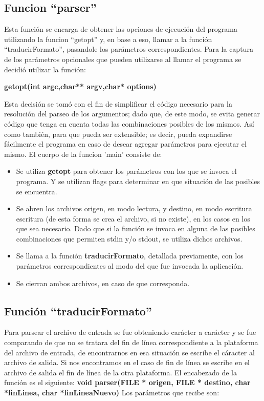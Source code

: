 \documentclass[a4paper,10pt]{article}
\begin{document}
  \subsection{Funcion ``parser''}
  Esta funci\'on se encarga de obtener las opciones de ejecuci\'on del programa utilizando la funcion ``getopt'' y, en base
  a eso, llamar a la funci\'on ``traducirFormato'', pasandole los par\'ametros correspondientes.
  \newline
  Para la captura de los par\'ametros opcionales que pueden utilizarse al 
  llamar el programa se decidi\'o utilizar la funci\'on:
  \begin{center}
    {\bf getopt(int argc,char** argv,char* options)}
  \end{center}
  Esta decisi\'on se tom\'o con el fin de simplificar el c\'odigo necesario para la resoluci\'on del parseo de los
  argumentos; dado que, de este modo, se evita generar c\'odigo que tenga
  en cuenta todas las combinaciones posibles de los mismos. As\'i como
  tambi\'en, para que pueda ser extensible; es decir, pueda expandirse
  f\'acilmente el programa en caso de desear agregar par\'ametros para
  ejecutar el mismo.
  El cuerpo de la funcion 'main' consiste de:
  \begin{itemize}
  \item Se utiliza {\bf getopt} para obtener los par\'ametros con los que se invoca el programa. Y se 
    utilizan flags para determinar en que situaci\'on de las posibles se encuentra.
  \item Se abren los archivos origen, en modo lectura, y destino, en modo escritura escritura (de esta
    forma se crea el archivo, si no existe), en los casos en los que sea necesario. Dado que si la funci\'on
    se invoca en alguna de las posibles combinaciones que permiten stdin y/o stdout, se utiliza dichos 
    archivos.
  \item Se llama a la funci\'on {\bf traducirFormato}, detallada previamente, con los par\'ametros 
    correspondientes al modo del que fue invocada la aplicaci\'on.
  \item Se cierran ambos archivos, en caso de que corresponda.
  \end{itemize}


  \subsection{Funci\'on ``traducirFormato''}
  Para parsear el archivo de entrada se fue obteniendo car\'acter a car\'acter y
  se fue comparando de que no se tratara del fin de l\'inea
  correspondiente a la plataforma del archivo de entrada, de
  encontrarnos en esa situaci\'on se escribe el c\'aracter al archivo de
  salida. Si nos encontramos en el caso de fin de l\'inea se escribe en el
  archivo de salida el fin de l\'inea de la otra plataforma. 
  El encabezado de la funci\'on es el siguiente:
  \newline
  {\bf void parser(FILE * origen, FILE * destino, char *finLinea, char *finLineaNuevo)}
  \newline
  Los par\'ametros que recibe son:
\end{document}
